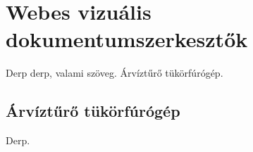 \chapter{Webes vizuális dokumentumszerkesztők}
Derp derp, valami szöveg. Árvíztűrő tükörfúrógép.


\section{Árvíztűrő tükörfúrógép}
Derp.



